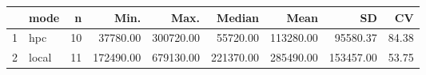 \begin{table}[ht]
\centering
\begin{tabular}{rlrrrrrrr}
  \hline
 & mode & n & Min. & Max. & Median & Mean & SD & CV \\ 
  \hline
1 & hpc &  10 & 37780.00 & 300720.00 & 55720.00 & 113280.00 & 95580.37 & 84.38 \\ 
  2 & local &  11 & 172490.00 & 679130.00 & 221370.00 & 285490.00 & 153457.00 & 53.75 \\ 
   \hline
\end{tabular}
\end{table}
